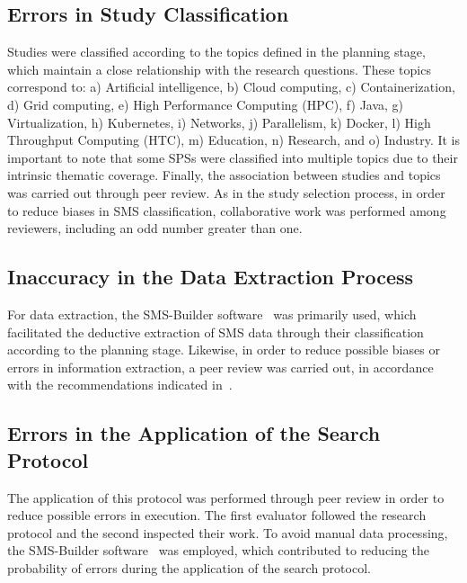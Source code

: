 \subsection{Errors in Study Classification}
Studies were classified according to the topics defined in the planning stage, which maintain a close relationship with the research questions.
These topics correspond to: a) Artificial intelligence, b) Cloud computing, c) Containerization, d) Grid computing, e) High Performance Computing (HPC), f) Java, g) Virtualization, h) Kubernetes, i) Networks, j) Parallelism, k) Docker, l) High Throughput Computing (HTC), m) Education, n) Research, and o) Industry.
It is important to note that some SPSs were classified into multiple topics due to their intrinsic thematic coverage. Finally, the association between studies and topics was carried out through peer review. As in the study selection process, in order to reduce biases in SMS classification, collaborative work was performed among reviewers, including an odd number greater than one.

\subsection{Inaccuracy in the Data Extraction Process}
For data extraction, the SMS-Builder software~\cite{sms-builder-repo} was primarily used, which facilitated the deductive extraction of SMS data through their classification according to the planning stage. Likewise, in order to reduce possible biases or errors in information extraction, a peer review was carried out, in accordance with the recommendations indicated in~\cite{Kitchenham2010792}.

\subsection{Errors in the Application of the Search Protocol}
The application of this protocol was performed through peer review in order to reduce possible errors in execution. The first evaluator followed the research protocol and the second inspected their work. To avoid manual data processing, the SMS-Builder software~\cite{sms-builder-repo} was employed, which contributed to reducing the probability of errors during the application of the search protocol.
